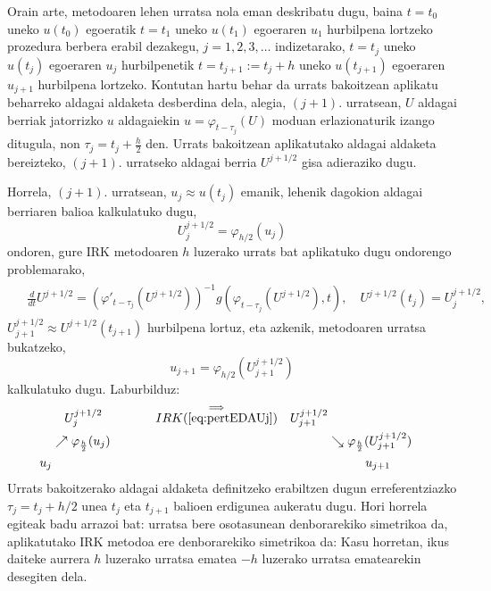 Orain arte, metodoaren lehen urratsa nola eman deskribatu dugu, baina $t=t_0$ uneko $u(t_0)$ egoeratik $t=t_1$ uneko $u(t_1)$ egoeraren $u_1$ hurbilpena lortzeko prozedura berbera erabil dezakegu, $j=1,2,3,\ldots$ indizetarako, $t=t_{j}$ uneko $u(t_j)$ egoeraren $u_j$ hurbilpenetik $t=t_{j+1}:= t_{j}+h$ uneko $u(t_{j+1})$ egoeraren $u_{j+1}$ hurbilpena lortzeko. Kontutan hartu behar da urrats bakoitzean aplikatu beharreko aldagai aldaketa  desberdina dela, alegia, $(j+1)$. urratsean, $U$ aldagai berriak jatorrizko $u$ aldagaiekin $u = \varphi_{t-\tau_j}(U)$ moduan erlazionaturik izango ditugula, non $\tau_j = t_j + \frac{h}{2}$ den. Urrats bakoitzean aplikatutako aldagai aldaketa bereizteko, $(j+1)$. urratseko aldagai berria $U^{j+1/2}$ gisa adieraziko dugu.

 Horrela, $(j+1)$. urratsean, $u_j \approx u(t_j)$ emanik, lehenik dagokion aldagai berriaren balioa kalkulatuko dugu,
\begin{equation*}
U^{j+1/2}_j = \varphi_{h/2}(u_j)
\end{equation*}
%
ondoren, gure IRK metodoaren $h$ luzerako urrats bat aplikatuko dugu ondorengo problemarako,
\begin{align}
\begin{split}
\label{eq:pertEDAUj}
&\frac{d}{dt} U^{j+1/2} = \left(\varphi'_{t-\tau_j}(U^{j+1/2})\right)^{-1} g\left(\varphi_{t-\tau_j}(U^{j+1/2}),t \right), \quad U^{j+1/2}(t_j) = U^{j+1/2}_j,
\end{split}
\end{align}
%
$U^{j+1/2}_{j+1} \approx U^{j+1/2}(t_{j+1})$ hurbilpena lortuz, eta azkenik, metodoaren urratsa bukatzeko,
%
\begin{equation*}
u_{j+1} = \varphi_{h/2}(U^{j+1/2}_{j+1})
\end{equation*}
%
kalkulatuko dugu.  Laburbilduz:
%
\begin{align*}
   &   \quad U^{j+1/2}_j \quad \quad \quad \quad \stackrel{\Longrightarrow}{IRK(\ref{eq:pertEDAUj})}  & U^{j+1/2}_{j+1}&  &\\
  & \nearrow \varphi_{\frac{h}{2}}(u_j) &            & \searrow \varphi_{\frac{h}{2}}(U^{j+1/2}_{j+1})& \\
u_j &                  &    &\quad \quad \quad  u_{j+1}
\end{align*}
%
Urrats bakoitzerako aldagai aldaketa definitzeko erabiltzen dugun erreferentziazko $\tau_j=t_j+h/2$ unea $t_j$ eta $t_{j+1}$ balioen erdigunea aukeratu dugu. Hori horrela egiteak badu arrazoi bat: urratsa bere osotasunean denborarekiko simetrikoa da, aplikatutako IRK metodoa ere denborarekiko simetrikoa da: Kasu horretan, ikus daiteke aurrera $h$ luzerako urratsa ematea $-h$ luzerako urratsa ematearekin desegiten dela.


